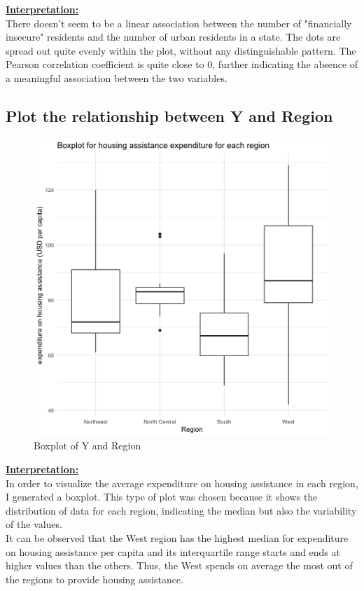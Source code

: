\documentclass[12pt,letterpaper]{article}
\begin{document}
\vspace{.5cm}
\underline{\textbf{Interpretation:}}\\[.3cm] There doesn't seem to be a linear association between the number of "financially insecure" residents and the number of urban residents in a state. The dots are spread out quite evenly within the plot, without any distinguishable pattern. The Pearson correlation coefficient is quite close to 0, further indicating the absence of a meaningful association between the two variables. 
\newpage
\subsection*{Plot the relationship between Y and Region}
 
\vspace{.5cm}
\begin{figure}[h!]\centering
	\caption{\footnotesize Boxplot of Y and Region}
	\label{fig:plot_7}
	\includegraphics[width=.7\textwidth]{boxplot_reg_y.png}
\end{figure}
\vspace{.5cm}
\underline{\textbf{Interpretation:}}\\[.3cm] In order to visualize the average expenditure on housing assistance in each region, I generated a boxplot. This type of plot was chosen because it shows the distribution of data for each region, indicating the median but also the variability of the values. \\ It can be observed that the West region has the highest median for expenditure on housing assistance per capita and its interquartile range starts and ends at higher values than the others. Thus, the West spends on average the most out of the regions to provide housing assistance. 
\newpage
\end{document}
